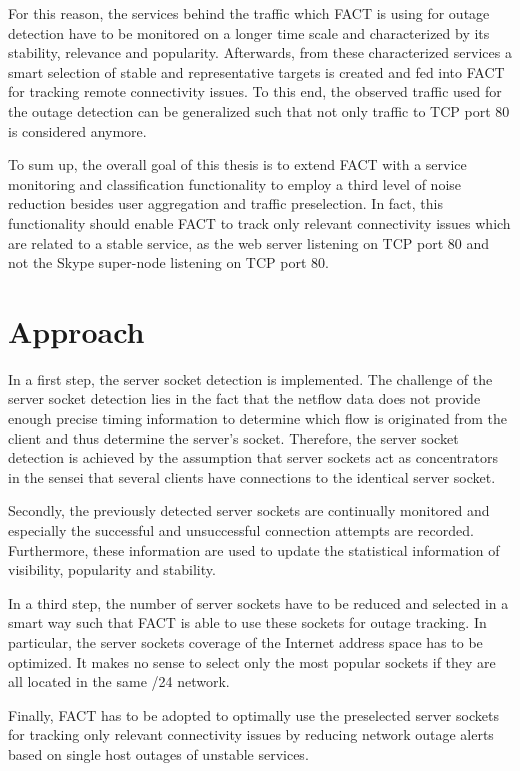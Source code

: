 \documentclass{sigcomm-alternate}
\begin{document}
For this reason, the services behind the traffic which FACT is using
for outage detection have to be monitored on a longer time scale and
characterized by its stability, relevance and popularity. Afterwards,
from these characterized services a smart selection of stable and
representative targets is created and fed into FACT for tracking remote
connectivity issues. To this end, the observed traffic used for the
outage detection can be generalized such that not only traffic to TCP
port 80 is considered anymore.

To sum up, the overall goal of this thesis is to extend FACT with
a service monitoring and classification functionality to employ a
third level of noise reduction besides user aggregation and traffic
preselection. In fact, this functionality should enable FACT to track
only relevant connectivity issues which are related to a stable service,
as the web server listening on TCP port 80 and not the Skype super-node
listening on TCP port 80.

\section{Approach}

In a first step, the server socket detection is implemented. The
challenge of the server socket detection lies in the fact that the
netflow data does not provide enough precise timing information to
determine which flow is originated from the client and thus determine
the server's socket. Therefore, the server socket detection is achieved
by the assumption that server sockets act as concentrators in the sensei
that several clients have connections to the identical server socket.

Secondly, the previously detected server sockets are continually
monitored and especially the successful and unsuccessful connection
attempts are recorded. Furthermore, these information are used to update
the statistical information of visibility, popularity and stability.

In a third step, the number of server sockets have to be reduced and
selected in a smart way such that FACT is able to use these sockets
for outage tracking. In particular, the server sockets coverage of the
Internet address space has to be optimized. It makes no sense to select
only the most popular sockets if they are all located in the same /24
network.

Finally, FACT has to be adopted to optimally use the preselected server
sockets for tracking only relevant connectivity issues by reducing
network outage alerts based on single host outages of unstable services.
\end{document}
